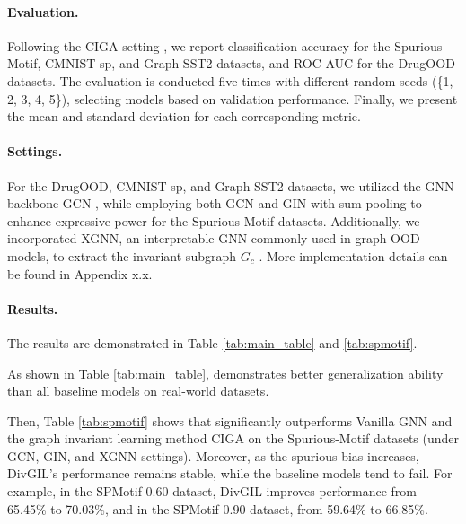 \paragraph{Evaluation.} Following the CIGA setting \citep{ciga}, we report classification accuracy for the Spurious-Motif, CMNIST-sp, and Graph-SST2 datasets, and ROC-AUC for the DrugOOD datasets. The evaluation is conducted five times with different random seeds (\{1, 2, 3, 4, 5\}), selecting models based on validation performance. Finally, we present the mean and standard deviation for each corresponding metric.

\paragraph{Settings.} For the DrugOOD, CMNIST-sp, and Graph-SST2 datasets, we utilized the GNN backbone GCN \citep{gcn}, while employing both GCN and GIN \citep{gin} with sum pooling to enhance expressive power for the Spurious-Motif datasets. Additionally, we incorporated XGNN, an interpretable GNN commonly used in graph OOD models, to extract the invariant subgraph \( G_c \) \citep{dir,gil,ciga}. More implementation details can be found in Appendix x.x.


\paragraph{Results.} The results are demonstrated in Table \ref{tab:main_table} and \ref{tab:spmotif}. 

As shown in Table \ref{tab:main_table}, \ours demonstrates better generalization ability than all baseline models on real-world datasets. 

Then, Table \ref{tab:spmotif} shows that \ours significantly outperforms Vanilla GNN and the graph invariant learning method CIGA on the Spurious-Motif datasets (under GCN, GIN, and XGNN settings). Moreover, as the spurious bias increases, DivGIL's performance remains stable, while the baseline models tend to fail. For example, in the SPMotif-0.60 dataset, DivGIL improves performance from 65.45\% to 70.03\%, and in the SPMotif-0.90 dataset, from 59.64\% to 66.85\%.



